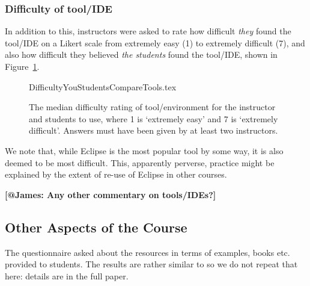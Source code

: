 \documentclass{sig-alternate}
\begin{document}
\subsubsection{Difficulty of tool/IDE}
In addition to this, instructors were asked to rate how difficult {\emph{they}} found the tool/IDE on a Likert scale from extremely easy (1) to extremely difficult (7), and also how difficult they believed {\emph{the students}} found the tool/IDE, shown in Figure~\ref{fig:toolhard}.

\begin{figure}
\begin{center}
{DifficultyYouStudentsCompareTools.tex}
\end{center}\vskip-18pt
\caption{The median difficulty rating of tool/environment for the instructor and students to use, where 1 is `extremely easy' and 7 is `extremely difficult'.  Answers must have been given by at least two instructors.\label{fig:toolhard}}
\end{figure}

We note that, while Eclipse is the most popular tool by some way, it is also deemed to be most difficult. This, apparently perverse, practice might be explained by the extent of re-use of Eclipse in other courses.

{\bf{[@James: Any other commentary on tools/IDEs?]}}


\subsection{Other Aspects of the Course}
\iffalse
\subsubsection{External Delivery}
\begin{figure}
\begin{center}
{Steps.tex}
\end{center}\vskip-18pt
\caption{Steps taken to determine whether students have received unauthorised assistance on assignments.\label{fig:Plagiarise}}
\end{figure}
\subsubsection{Resources provided to students}
\fi
The questionnaire asked about the resources in terms of examples,
books etc. provided to students. The results are rather similar to
\cite[Figure 14]{mason+cooper:2014} so we do not repeat that here:
details are in the full paper.
\end{document}
